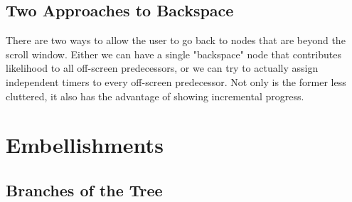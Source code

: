 \subsection{Two Approaches to Backspace}

There are two ways to allow the user to go back to 
nodes that are beyond the scroll window. Either we can have
a single "backspace" node that contributes likelihood to all
off-screen predecessors, or we can try to actually assign independent
timers to every off-screen predecessor. Not only is the former
less cluttered, it also has the advantage of showing incremental progress.

\section{Embellishments}
\subsection{Branches of the Tree}


